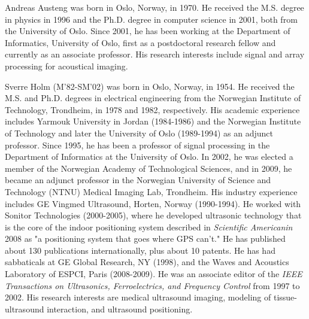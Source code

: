 \documentclass[journal]{IEEEtran}
\begin{document}
\begin{IEEEbiography}{Andreas Austeng}
was born in Oslo, Norway, in 1970. He received the M.S. degree in physics in 1996 and the Ph.D. degree in computer science in 2001, both from the University of Oslo. Since 2001, he has been working at the Department of Informatics, University of Oslo, first as a postdoctoral research fellow and currently as an associate professor. His research interests include signal and array processing for acoustical imaging.
\end{IEEEbiography}


\begin{IEEEbiography}{Sverre Holm}
(M’82-SM’02) was born in Oslo, Norway, in 1954. He received the M.S. and Ph.D. degrees in electrical engineering from the Norwegian Institute of Technology, Trondheim, in 1978 and 1982, respectively. His academic experience includes Yarmouk University in Jordan (1984-1986) and the Norwegian Institute of Technology and later the University of Oslo (1989-1994) as an adjunct professor. Since 1995, he has been a professor of signal processing in the Department of Informatics at the University of Oslo. In 2002, he was elected a member of the Norwegian Academy of Technological Sciences, and in 2009, he became an adjunct professor in the Norwegian University of Science and Technology (NTNU) Medical Imaging Lab, Trondheim. His industry experience includes GE Vingmed Ultrasound, Horten, Norway (1990-1994). He worked with Sonitor Technologies (2000-2005), where he developed ultrasonic technology that is the core of the indoor positioning system described in \textit{Scientific Americanin} 2008 as "a positioning system that goes where GPS can't." He has published about 130 publications internationally, plus about 10 patents. He has had sabbaticals at GE Global Research, NY (1998), and the Waves and 
Acoustics Laboratory of ESPCI, Paris (2008-2009). He was an associate editor of the \textit{IEEE Transactions on Ultrasonics, Ferroelectrics, and Frequency Control} from 1997 to 2002. His research interests are medical ultrasound imaging, modeling of tissue-ultrasound interaction, and ultrasound positioning.
\end{IEEEbiography}
\end{document}
